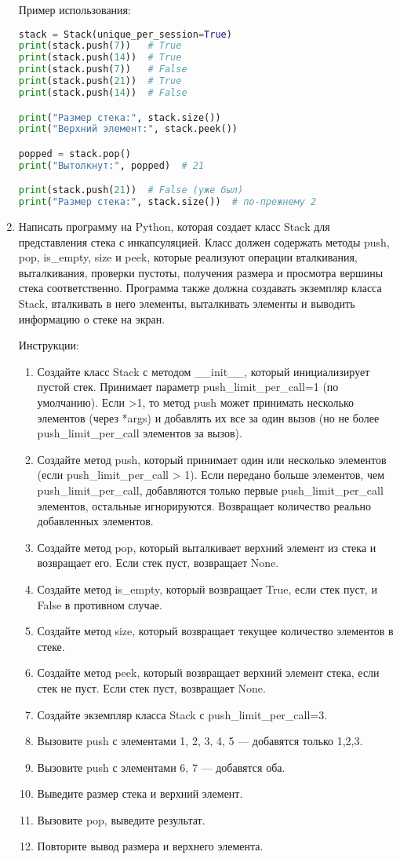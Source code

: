 \begin{enumerate}
Пример использования:
\begin{lstlisting}[language=Python]
stack = Stack(unique_per_session=True)
print(stack.push(7))   # True
print(stack.push(14))  # True
print(stack.push(7))   # False
print(stack.push(21))  # True
print(stack.push(14))  # False

print("Размер стека:", stack.size())
print("Верхний элемент:", stack.peek())

popped = stack.pop()
print("Вытолкнут:", popped)  # 21

print(stack.push(21))  # False (уже был)
print("Размер стека:", stack.size())  # по-прежнему 2
\end{lstlisting}

\item Написать программу на Python, которая создает класс Stack для представления стека с инкапсуляцией. Класс должен содержать методы push, pop, is\_empty, size и peek, которые реализуют операции вталкивания, выталкивания, проверки пустоты, получения размера и просмотра вершины стека соответственно. Программа также должна создавать экземпляр класса Stack, вталкивать в него элементы, выталкивать элементы и выводить информацию о стеке на экран.

Инструкции:
\begin{enumerate}
    \item Создайте класс Stack с методом \_\_init\_\_, который инициализирует пустой стек. Принимает параметр push\_limit\_per\_call=1 (по умолчанию). Если >1, то метод push может принимать несколько элементов (через *args) и добавлять их все за один вызов (но не более push\_limit\_per\_call элементов за вызов).
    \item Создайте метод push, который принимает один или несколько элементов (если push\_limit\_per\_call > 1). Если передано больше элементов, чем push\_limit\_per\_call, добавляются только первые push\_limit\_per\_call элементов, остальные игнорируются. Возвращает количество реально добавленных элементов.
    \item Создайте метод pop, который выталкивает верхний элемент из стека и возвращает его. Если стек пуст, возвращает None.
    \item Создайте метод is\_empty, который возвращает True, если стек пуст, и False в противном случае.
    \item Создайте метод size, который возвращает текущее количество элементов в стеке.
    \item Создайте метод peek, который возвращает верхний элемент стека, если стек не пуст. Если стек пуст, возвращает None.
    \item Создайте экземпляр класса Stack с push\_limit\_per\_call=3.
    \item Вызовите push с элементами 1, 2, 3, 4, 5 — добавятся только 1,2,3.
    \item Вызовите push с элементами 6, 7 — добавятся оба.
    \item Выведите размер стека и верхний элемент.
    \item Вызовите pop, выведите результат.
    \item Повторите вывод размера и верхнего элемента.
\end{enumerate}


\end{enumerate}
